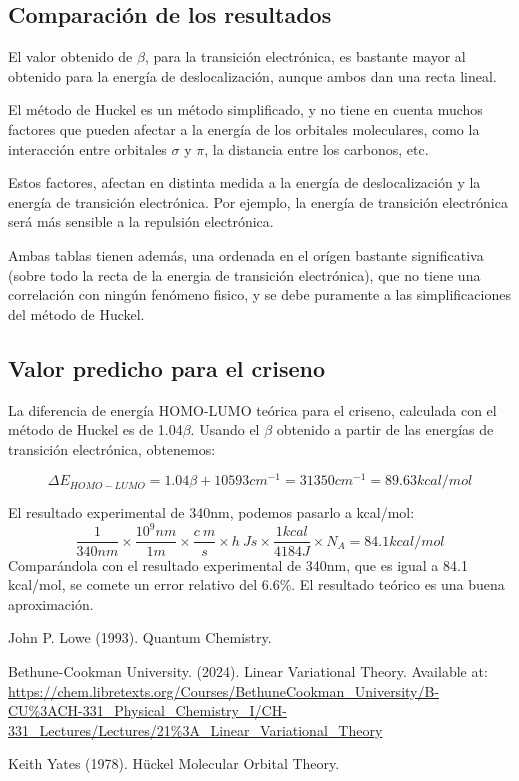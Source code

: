 \documentclass[12pt]{article}
\begin{document}
\subsection{Comparación de los resultados}
El valor obtenido de $\beta$, para la transición electrónica, es bastante mayor al obtenido para la energía de deslocalización, aunque ambos dan una recta lineal.

El método de Huckel es un método simplificado, y no tiene en cuenta muchos factores que pueden afectar a la energía de los orbitales moleculares, como la interacción entre orbitales $\sigma$ y $\pi$, la distancia entre los carbonos, etc.

Estos factores, afectan en distinta medida a la  energía de deslocalización y la energía de transición electrónica. Por ejemplo, la energía de transición electrónica será más sensible a la repulsión electrónica.

Ambas tablas tienen además, una ordenada en el orígen bastante significativa (sobre todo la recta de la energia de transición electrónica), que no tiene una correlación con ningún fenómeno fisico, y se debe puramente a las simplificaciones del método de Huckel.






\subsection{Valor predicho para el criseno}
La diferencia de energía HOMO-LUMO teórica para el criseno, calculada con el método de Huckel es de 1.04$\beta$.
Usando el $\beta$ obtenido a partir de las energías de transición electrónica, obtenemos:

\[
    \Delta E_{HOMO-LUMO}=1.04\beta + 10593cm^{-1}=31350cm^{-1}=89.63kcal/mol
\]

El resultado experimental de 340nm, podemos pasarlo a kcal/mol:
\[
    \frac{1}{340nm} \times \frac{10^9nm}{1m} \times \frac{c\ m}{s} \times h\ Js \times \frac{1kcal}{4184 J} \times N_A = 84.1kcal/mol
\]
Comparándola con el resultado experimental de 340nm, que es igual a 84.1 kcal/mol, se comete un error relativo del 6.6\%. El resultado teórico es una buena aproximación.





\newpage
\begin{thebibliography}{9}


John P. Lowe (1993). Quantum Chemistry.

Bethune-Cookman University. (2024). Linear Variational Theory. Available at: \url{https://chem.libretexts.org/Courses/BethuneCookman_University/B-CU%3ACH-331_Physical_Chemistry_I/CH-331_Lectures/Lectures/21%3A_Linear_Variational_Theory}

Keith Yates (1978). Hückel Molecular Orbital Theory.


\end{thebibliography}
\end{document}
